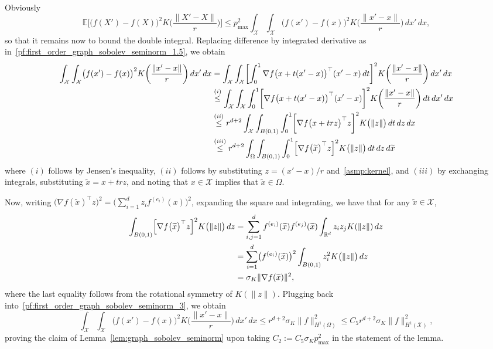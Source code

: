 \documentclass[twoside]{article}
\newcommand{\Reals}{\mathbb{R}}
\newcommand{\1}{\mathbf{1}}
\newcommand{\Rd}{\Reals^d}
\newcommand{\Xset}{\mathcal{X}}
\newcommand{\mc}[1]{\mathcal{#1}}
\newcommand{\Ebb}{\mathbb{E}}
\newcommand{\wt}[1]{\widetilde{#1}}
\theoremstyle{definition}
\theoremstyle{remark}
\begin{document}
Obviously
\begin{equation}
\Ebb\biggl[\bigl(f(X') - f(X)\bigr)^2K\biggl(\frac{\|X' - X\|}{r}\biggr)\biggr] \leq p_{\max}^2 \int_{\Xset} \int_{\Xset} \bigl(f(x') - f(x)\bigr)^2 K\biggl(\frac{\|x' - x\|}{r}\biggr) \,dx' \,dx, \label{pf:first_order_graph_sobolev_seminorm_2}
\end{equation}
so that it remains now to bound the double integral. Replacing difference by integrated derivative as in~\eqref{pf:first_order_graph_sobolev_seminorm_1.5}, we obtain
\begin{align}
\int_{\Xset} \int_{\Xset} \bigl(f(x') - f(x)\bigr)^2 K\biggl(\frac{\|x' - x\|}{r}\biggr) \,dx' \,dx & = \int_{\Xset} \int_{\Xset} \biggl[\int_{0}^{1} \nabla f\bigl(x + t(x' - x)\bigr)^{\top} (x' - x)\,dt\biggr]^2 K\biggl(\frac{\|x' - x\|}{r}\biggr) \,dx' \,dx \nonumber \\
& \overset{(i)}{\leq} \int_{\Xset} \int_{\Xset} \int_{0}^{1} \biggl[\nabla f\bigl(x + t(x' - x)\bigr)^{\top} (x' - x)\biggr]^2 K\biggl(\frac{\|x' - x\|}{r}\biggr) \,dt\,dx' \,dx \nonumber \\
& \overset{(ii)}{\leq} r^{d + 2} \int_{\Xset} \int_{B(0,1)} \int_{0}^{1} \biggl[\nabla f\bigl(x + trz\bigr)^{\top} z\biggr]^2 K\bigl(\|z\|\bigr) \,dt\,dz \,dx \nonumber \\
&  \overset{(iii)}{\leq} r^{d + 2} \int_{\Omega} \int_{B(0,1)} \int_{0}^{1} \Bigl[\nabla f\bigl(\wt{x}\bigr)^{\top} z\Bigr]^2 K\bigl(\|z\|\bigr) \,dt \,dz \,d\wt{x} \label{pf:first_order_graph_sobolev_seminorm_3} 
\end{align}
where $(i)$ follows by Jensen's inequality, $(ii)$ follows by substituting $z = (x' - x)/r$ and~\ref{asmp:kernel}, and $(iii)$ by exchanging integrals, substituting $\wt{x} = x + trz$, and noting that $x \in \mc{X}$ implies that $\wt{x} \in \Omega$.

Now, writing $\bigl(\nabla f(\wt{x}) ^{\top} z\bigr)^2 = \bigl(\sum_{i = 1}^{d} z_{i} f^{(e_i)}(x) \bigr)^2$, expanding the square and integrating, we have that for any $\wt{x} \in \Xset$,
\begin{align*}
\int_{B(0,1)} \Bigl[\nabla f\bigl(\wt{x}\bigr)^{\top} z\Bigr]^2 K\bigl(\|z\|\bigr) \,dz & = \sum_{i,j = 1}^{d} f^{(e_i)}(\wt{x}) f^{(e_j)}(\wt{x}) \int_{\Rd} z_iz_jK(\|z\|) \,dz \\
& = \sum_{i = 1}^{d} \bigl(f^{(e_i)}(\wt{x})\bigr)^2 \int_{B(0,1)} z_i^2 K\bigl(\|z\|\bigr) \,dz \\
& = \sigma_K \|\nabla f(\wt{x})\|^2,
\end{align*}
where the last equality follows from the rotational symmetry of $K(\|z\|)$. Plugging back into~\eqref{pf:first_order_graph_sobolev_seminorm_3}, we obtain
\begin{equation*}
\int_{\Xset} \int_{\Xset} \bigl(f(x') - f(x)\bigr)^2 K\biggl(\frac{\|x' - x\|}{r}\biggr) \,dx' \,dx \leq r^{d + 2} \sigma_K \|f\|_{H^1(\Omega)}^2 \leq C_5 r^{d + 2} \sigma_K \|f\|_{H^1(\mc{X})}^2,
\end{equation*}
proving the claim of Lemma~\ref{lem:graph_sobolev_seminorm} upon taking $C_2 := C_5 \sigma_K p_{\max}^2$ in the statement of the lemma.
\end{document}
